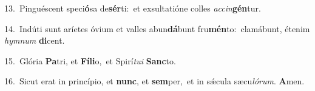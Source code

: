 {\numbfont\textcolor{\numbcolor}{13.}}~Pinguéscent speci\-\textbf{ó}\-sa de\-\textbf{sér}\-ti:~\star et exsultatióne colles \textit{ac}\-\textit{cin}\textbf{gén}tur.\par
{\numbfont\textcolor{\numbcolor}{14.}}~Indúti sunt aríetes óvium et valles abun\-\textbf{dá}\-bunt fru\-\textbf{mén}\-to:~\star clamábunt, étenim \textit{hym}\-\textit{num} \textbf{di}\-cent.\par
{\numbfont\textcolor{\numbcolor}{15.}}~Glória \textbf{Pa}\-tri, et \textbf{Fí}\-\textbf{li}o,~\star et Spirí\-\textit{tu}\-\textit{i} \textbf{Sanc}\-to.\par
{\numbfont\textcolor{\numbcolor}{16.}}~Sicut erat in princípio, et \textbf{nunc}\-, et \textbf{sem}\-per,~\star et in sǽcula sæcu\-\textit{ló}\-\textit{rum}. \textbf{A}\-men.\par
